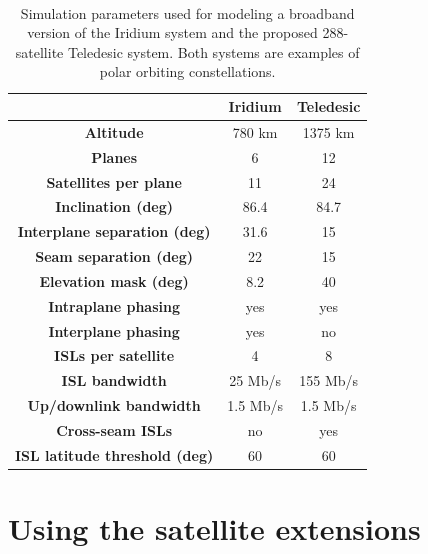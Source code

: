 \begin{table}[h]
\begin{center}
{\tt
\begin{tabular}{|c||c|c|}\hline
& {\bf Iridium} & {\bf Teledesic}\\\hline\hline
{\bf Altitude} & \rm 780 km& \rm 1375 km\\\hline
{\bf Planes} & \rm 6& \rm 12\\\hline
{\bf Satellites per plane} & \rm 11 & \rm 24\\\hline
{\bf Inclination (deg)} & \rm 86.4 & \rm 84.7\\\hline
{\bf Interplane separation (deg)} & \rm 31.6 & \rm 15\\\hline
{\bf Seam separation (deg)} & \rm 22 & \rm 15\\\hline
{\bf Elevation mask (deg)} & \rm 8.2 & \rm 40\\\hline
{\bf Intraplane phasing} & \rm yes & \rm yes\\\hline
{\bf Interplane phasing} & \rm yes & \rm no\\\hline
{\bf ISLs per satellite} & \rm 4  & \rm 8\\\hline
{\bf ISL bandwidth} & \rm 25 Mb/s  & \rm 155 Mb/s\\\hline
{\bf Up/downlink bandwidth} & \rm 1.5 Mb/s  & \rm 1.5 Mb/s\\\hline
{\bf Cross-seam ISLs} & \rm no & \rm yes\\\hline
{\bf ISL latitude threshold (deg)} & \rm 60 & \rm 60\\\hline
\end{tabular}
}
\end{center}
\caption{Simulation parameters used for modeling a broadband version of
the Iridium system and the proposed 288-satellite Teledesic system.
Both systems are examples of polar orbiting constellations.
}
\end{table}
\clearpage

\section{Using the satellite extensions}
\label{sec:satellite/usage}

